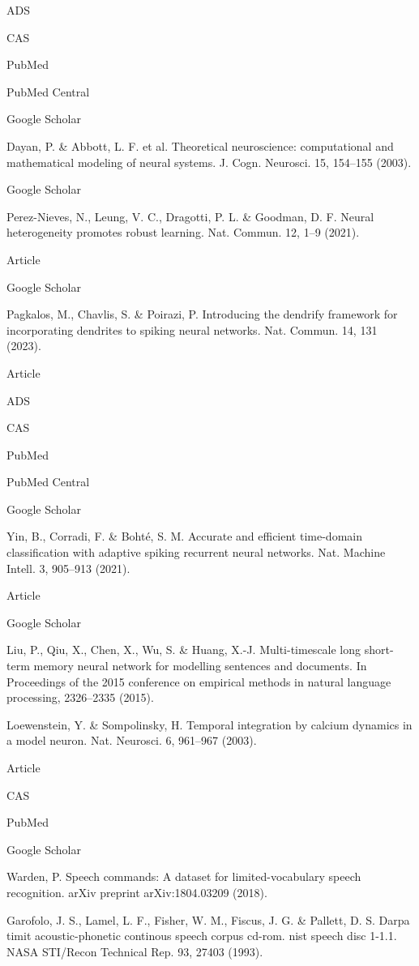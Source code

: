 ADS
 
CAS
 
PubMed
 
PubMed Central
 
Google Scholar
 

Dayan, P. & Abbott, L. F. et al. Theoretical neuroscience: computational and mathematical modeling of neural systems. J. Cogn. Neurosci. 15, 154–155 (2003).

Google Scholar
 

Perez-Nieves, N., Leung, V. C., Dragotti, P. L. & Goodman, D. F. Neural heterogeneity promotes robust learning. Nat. Commun. 12, 1–9 (2021).

Article
 
Google Scholar
 

Pagkalos, M., Chavlis, S. & Poirazi, P. Introducing the dendrify framework for incorporating dendrites to spiking neural networks. Nat. Commun. 14, 131 (2023).

Article
 
ADS
 
CAS
 
PubMed
 
PubMed Central
 
Google Scholar
 

Yin, B., Corradi, F. & Bohté, S. M. Accurate and efficient time-domain classification with adaptive spiking recurrent neural networks. Nat. Machine Intell. 3, 905–913 (2021).

Article
 
Google Scholar
 

Liu, P., Qiu, X., Chen, X., Wu, S. & Huang, X.-J. Multi-timescale long short-term memory neural network for modelling sentences and documents. In Proceedings of the 2015 conference on empirical methods in natural language processing, 2326–2335 (2015).

Loewenstein, Y. & Sompolinsky, H. Temporal integration by calcium dynamics in a model neuron. Nat. Neurosci. 6, 961–967 (2003).

Article
 
CAS
 
PubMed
 
Google Scholar
 

Warden, P. Speech commands: A dataset for limited-vocabulary speech recognition. arXiv preprint arXiv:1804.03209 (2018).

Garofolo, J. S., Lamel, L. F., Fisher, W. M., Fiscus, J. G. & Pallett, D. S. Darpa timit acoustic-phonetic continous speech corpus cd-rom. nist speech disc 1-1.1. NASA STI/Recon Technical Rep. 93, 27403 (1993).

